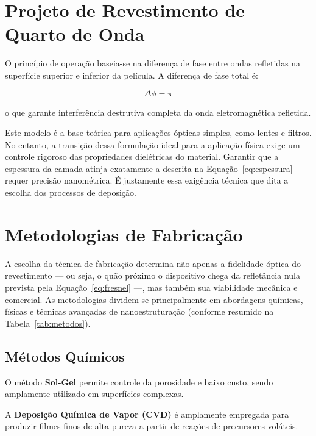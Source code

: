 \documentclass[12pt]{article}
\begin{document}
\section{Projeto de Revestimento de Quarto de Onda}

O princípio de operação baseia-se na diferença de fase entre ondas refletidas na superfície superior e inferior da película. A diferença de fase total é:

\begin{equation}
    \Delta \phi = \pi
    \label{eq:fase}
\end{equation}

o que garante interferência destrutiva completa da onda eletromagnética refletida.

Este modelo é a base teórica para aplicações ópticas simples, como lentes e filtros. No entanto, a transição dessa formulação ideal para a aplicação física exige um controle rigoroso das propriedades dielétricas do material. Garantir que a espessura da camada atinja exatamente a descrita na Equação~\ref{eq:espessura} requer precisão nanométrica. É justamente essa exigência técnica que dita a escolha dos processos de deposição.

\section{Metodologias de Fabricação}

A escolha da técnica de fabricação determina não apenas a fidelidade óptica do revestimento — ou seja, o quão próximo o dispositivo chega da refletância nula prevista pela Equação~\ref{eq:fresnel} —, mas também sua viabilidade mecânica e comercial. As metodologias dividem-se principalmente em abordagens químicas, físicas e técnicas avançadas de nanoestruturação (conforme resumido na Tabela~\ref{tab:metodos}).

\subsection{Métodos Químicos}

O método \textbf{Sol-Gel} permite controle da porosidade e baixo custo, sendo amplamente utilizado em superfícies complexas.

A \textbf{Deposição Química de Vapor (CVD)} é amplamente empregada para produzir filmes finos de alta pureza a partir de reações de precursores voláteis.
\end{document}

